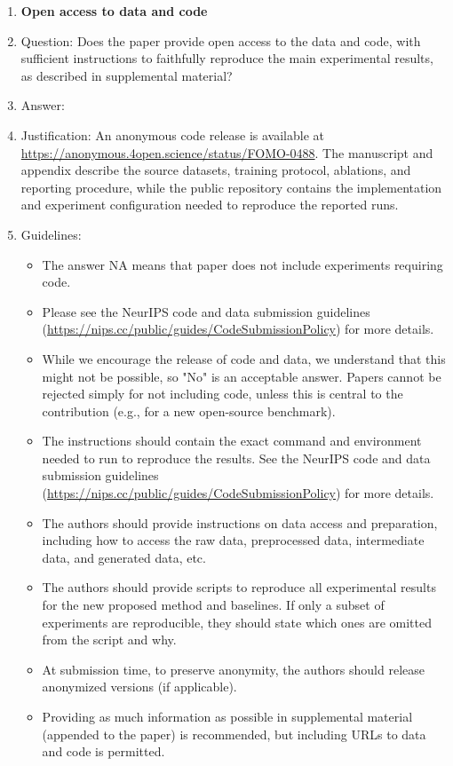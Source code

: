 \documentclass{article}
\begin{document}
\begin{enumerate}
\item {\bf Open access to data and code}
    \item[] Question: Does the paper provide open access to the data and code, with sufficient instructions to faithfully reproduce the main experimental results, as described in supplemental material?
    \item[] Answer: \answerYes{}
    \item[] Justification: An anonymous code release is available at \url{https://anonymous.4open.science/status/FOMO-0488}. The manuscript and appendix describe the source datasets, training protocol, ablations, and reporting procedure, while the public repository contains the implementation and experiment configuration needed to reproduce the reported runs.
    \item[] Guidelines:
    \begin{itemize}
        \item The answer NA means that paper does not include experiments requiring code.
        \item Please see the NeurIPS code and data submission guidelines (\url{https://nips.cc/public/guides/CodeSubmissionPolicy}) for more details.
        \item While we encourage the release of code and data, we understand that this might not be possible, so "No" is an acceptable answer. Papers cannot be rejected simply for not including code, unless this is central to the contribution (e.g., for a new open-source benchmark).
        \item The instructions should contain the exact command and environment needed to run to reproduce the results. See the NeurIPS code and data submission guidelines (\url{https://nips.cc/public/guides/CodeSubmissionPolicy}) for more details.
        \item The authors should provide instructions on data access and preparation, including how to access the raw data, preprocessed data, intermediate data, and generated data, etc.
        \item The authors should provide scripts to reproduce all experimental results for the new proposed method and baselines. If only a subset of experiments are reproducible, they should state which ones are omitted from the script and why.
        \item At submission time, to preserve anonymity, the authors should release anonymized versions (if applicable).
        \item Providing as much information as possible in supplemental material (appended to the paper) is recommended, but including URLs to data and code is permitted.
    \end{itemize}



\end{enumerate}
\end{document}
